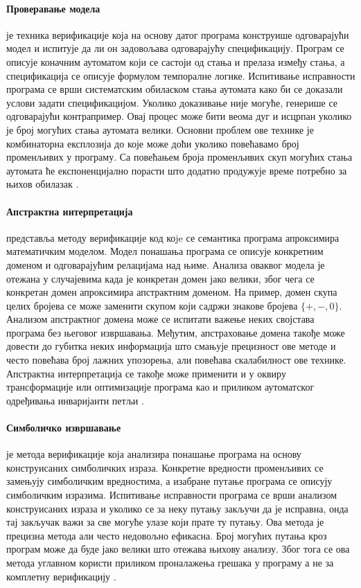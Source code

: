 \documentclass[12pt,oneside]{memoir}
\begin{document}
\paragraph{Проверавање модела} је техника верификације која на основу датог програма конструише одговарајући модел и испитује да ли он задовољава одговарајућу спецификацију. Програм се описује коначним аутоматом који се састоји од стања и прелаза између стања, а спецификација се описује формулом темпоралне логике. Испитивање исправности програма се врши систематским обиласком стања аутомата како би се доказали услови задати спецификацијом. Уколико доказивање није могуће, генерише се одговарајући контрапример. Овај процес може бити веома дуг и исцрпан уколико је број могућих стања аутомата велики. Основни проблем ове технике је комбинаторна експлозија до које може доћи уколико повећавамо број променљивих у програму. Са повећањем броја променљивих скуп могућих стања аутомата ће експоненцијално порасти што додатно продужује време потребно за њихов обилазак \cite{mvjphd,verif_tech}.

\paragraph{Апстрактна интерпретација} представља методу верификације код коje се семантика програма апроксимира математичким моделом. Модел понашања програма се описује конкретним доменом и одговарајућим релацијама над њиме. Анализа оваквог модела је отежана у случајевима када је конкретан домен јако велики, због чега се конкретан домен апроксимира апстрактним доменом. На пример, домен скупа целих бројева се може заменити скупом који садржи знакове бројева $ \{+,-,0\}$. Анализом апстрактног домена може се испитати важење неких својстава програма без његовог извршавања. Међутим, апстраховање домена такође може довести до губитка неких информација што смањује прецизност ове методе и често повећава број лажних упозорења, али повећава скалабилност ове технике. Апстрактна интерпретација се такође може применити и у оквиру трансформације или оптимизације програма као и приликом аутоматског одређивања инваријанти петљи \cite{mvjphd,verif_tech}. 

\paragraph{Симболичко извршавање} је метода верификације која анализира понашање програма на основу конструисаних симболичких израза. Конкретне вредности променљивих се замењују симболичким вредностима, а изабране путање програма се описују симболичким изразима. Испитивање исправности програма се врши анализом конструисаних израза и уколико се за неку путању закључи да је исправна, онда тај закључак важи за све могуће улазе који прате ту путању. Ова метода је прецизна метода али често недовољно ефикасна. Број могућих путања кроз програм може да буде јако велики што отежава њихову анализу. Због тога се ова метода углавном користи приликом проналажења грешака у програму а не за комплетну верификацију \cite{mvjphd,symbolic_exec}.
\end{document}
